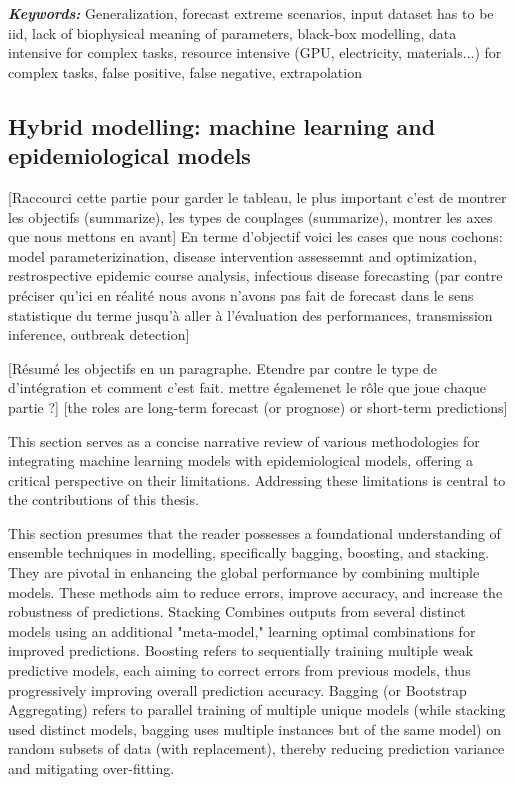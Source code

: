 \textit{\textbf{Keywords:}} Generalization, forecast extreme scenarios, input dataset has to be iid, lack of biophysical meaning of parameters, black-box modelling, data intensive for complex tasks, resource intensive (GPU, electricity, materials...) for complex tasks, false positive, false negative, extrapolation


\subsection{Hybrid modelling: machine learning and epidemiological models}

[Raccourci cette partie pour garder le tableau, le plus important c'est de montrer les objectifs (summarize), les types de couplages (summarize), montrer les axes que nous mettons en avant]
En terme d'objectif voici les cases que nous cochons: model parameterizination, disease intervention assessemnt and optimization, restrospective epidemic course analysis, infectious disease forecasting (par contre préciser qu'ici en réalité nous avons n'avons pas fait de forecast dans le sens statistique du terme jusqu'à aller à l'évaluation des performances, transmission inference, outbreak detection]

[Résumé les objectifs en un paragraphe. Etendre par contre le type de d'intégration et comment c'est fait. mettre égalemenet le rôle que joue chaque partie ?] [the roles are long-term forecast (or prognose) or short-term predictions]

This section serves as a concise narrative review of various methodologies for integrating machine learning models with epidemiological models, offering a critical perspective on their limitations. Addressing these limitations is central to the contributions of this thesis.

This section presumes that the reader possesses a foundational understanding of ensemble techniques in modelling, specifically bagging, boosting, and stacking. They are pivotal in enhancing the global performance by combining multiple models. These methods aim to reduce errors, improve accuracy, and increase the robustness of predictions. Stacking Combines outputs from several distinct models using an additional "meta-model," learning optimal combinations for improved predictions. Boosting refers to sequentially training multiple weak predictive models, each aiming to correct errors from previous models, thus progressively improving overall prediction accuracy. Bagging (or Bootstrap Aggregating) refers to parallel training of multiple unique models (while stacking used distinct models, bagging uses multiple instances but of the same model) on random subsets of data (with replacement), thereby reducing prediction variance and mitigating over-fitting.

